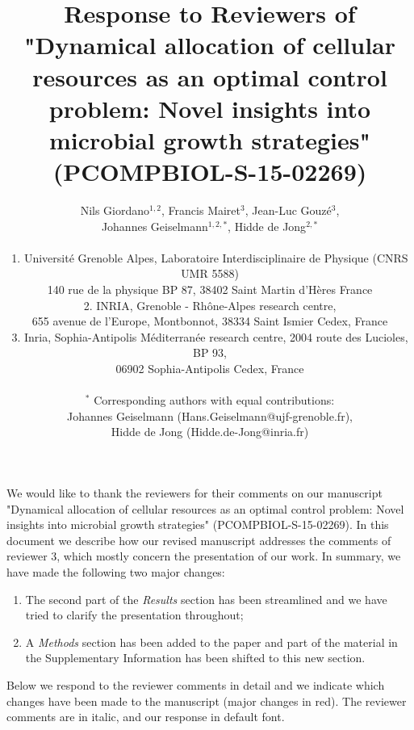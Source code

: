 \documentclass[11pt]{article}
\begin{document}
\title{\bf Response to Reviewers of "Dynamical allocation of cellular resources as an optimal control problem: Novel
insights into microbial growth strategies" (PCOMPBIOL-S-15-02269)}

\author{Nils Giordano$^{\text{}1,2}$, Francis Mairet$^{\text{}3}$, Jean-Luc Gouz\'{e}$^{\text{}3}$, \\ Johannes Geiselmann$^{\text{}1,2,*}$, Hidde de Jong$^{\text{}2,*}$ \\ \\
1. Universit\'e Grenoble Alpes, Laboratoire Interdisciplinaire de Physique (CNRS UMR 5588) \\ 140 rue de la physique BP 87, 38402 Saint Martin d'H\`{e}res  France\\
2. INRIA, Grenoble - Rh\^one-Alpes research centre,\\ 655 avenue de l'Europe, Montbonnot, 38334 Saint Ismier Cedex, France \\
3. Inria, Sophia-Antipolis M\'{e}diterran\'{e}e research centre, 2004 route des Lucioles, BP 93,\\ 06902 Sophia-Antipolis Cedex, France \\
\\
$^{*}$ Corresponding authors with equal contributions: \\ Johannes Geiselmann (Hans.Geiselmann@ujf-grenoble.fr), \\ Hidde de Jong (Hidde.de-Jong@inria.fr)
}


\date{}

\maketitle

\noindent  We would like to thank the reviewers for their comments on our manuscript "Dynamical allocation of cellular resources as an optimal control problem: Novel insights into microbial growth strategies" (PCOMPBIOL-S-15-02269). In this document we describe how our revised manuscript addresses the comments of reviewer 3, which mostly concern the presentation of our work. In summary, we have made the following two major changes:

\begin{enumerate}
\item The second part of the \textit{Results} section has been streamlined and we have tried to clarify the presentation throughout;
\item A \textit{Methods} section has been added to the paper and part of the material in the Supplementary Information has been shifted to this new section.
\end{enumerate}
Below we respond to the reviewer comments in detail and we indicate which changes have been made to the manuscript (major changes in red). The reviewer comments are in italic, and our response in default font.
\end{document}
